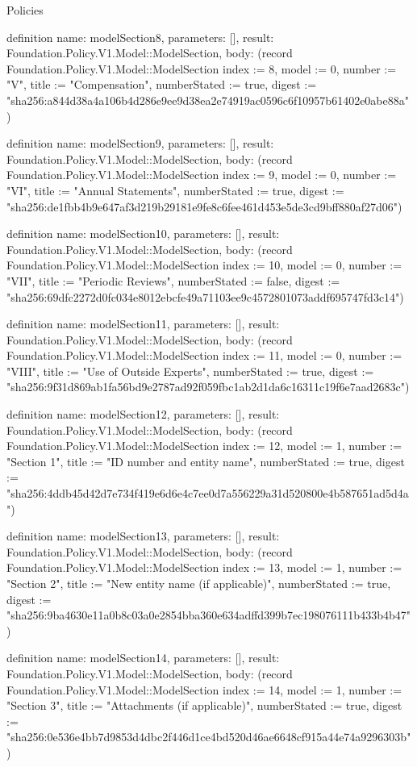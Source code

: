 \begin{lexlean}{Policies}
\begin{semanticmodule}
definition{
  name: modelSection8,
  parameters: [],
  result: Foundation.Policy.V1.Model::ModelSection,
  body: (record Foundation.Policy.V1.Model::ModelSection {index := 8, model := 0, number := "V", title := "Compensation", numberStated := true, digest := "sha256:a844d38a4a106b4d286e9ee9d38ea2e74919ac0596c6f10957b61402e0abe88a"})
}

definition{
  name: modelSection9,
  parameters: [],
  result: Foundation.Policy.V1.Model::ModelSection,
  body: (record Foundation.Policy.V1.Model::ModelSection {index := 9, model := 0, number := "VI", title := "Annual Statements", numberStated := true, digest := "sha256:de1fbb4b9e647af3d219b29181e9fe8c6fee461d453e5de3cd9bff880af27d06"})
}

definition{
  name: modelSection10,
  parameters: [],
  result: Foundation.Policy.V1.Model::ModelSection,
  body: (record Foundation.Policy.V1.Model::ModelSection {index := 10, model := 0, number := "VII", title := "Periodic Reviews", numberStated := false, digest := "sha256:69dfc2272d0fc034e8012ebcfe49a71103ee9c4572801073addf695747fd3c14"})
}

definition{
  name: modelSection11,
  parameters: [],
  result: Foundation.Policy.V1.Model::ModelSection,
  body: (record Foundation.Policy.V1.Model::ModelSection {index := 11, model := 0, number := "VIII", title := "Use of Outside Experts", numberStated := true, digest := "sha256:9f31d869ab1fa56bd9e2787ad92f059fbc1ab2d1da6c16311c19f6e7aad2683c"})
}

definition{
  name: modelSection12,
  parameters: [],
  result: Foundation.Policy.V1.Model::ModelSection,
  body: (record Foundation.Policy.V1.Model::ModelSection {index := 12, model := 1, number := "Section 1", title := "ID number and entity name", numberStated := true, digest := "sha256:4ddb45d42d7e734f419e6d6e4c7ee0d7a556229a31d520800e4b587651ad5d4a"})
}

definition{
  name: modelSection13,
  parameters: [],
  result: Foundation.Policy.V1.Model::ModelSection,
  body: (record Foundation.Policy.V1.Model::ModelSection {index := 13, model := 1, number := "Section 2", title := "New entity name (if applicable)", numberStated := true, digest := "sha256:9ba4630e11a0b8c03a0e2854bba360e634adffd399b7ec198076111b433b4b47"})
}

definition{
  name: modelSection14,
  parameters: [],
  result: Foundation.Policy.V1.Model::ModelSection,
  body: (record Foundation.Policy.V1.Model::ModelSection {index := 14, model := 1, number := "Section 3", title := "Attachments (if applicable)", numberStated := true, digest := "sha256:0e536e4bb7d9853d4dbc2f446d1ce4bd520d46ae6648cf915a44e74a9296303b"})
}


\end{semanticmodule}
\end{lexlean}
